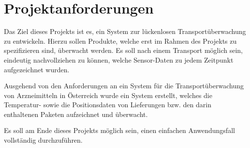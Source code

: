 \section{Projektanforderungen}
\label{sec:requirements}

Das Ziel dieses Projekts ist es, ein System zur lückenlosen Transportüberwachung
	zu entwickeln. Hierzu sollen Produkte, welche erst im Rahmen des Projekts zu
	spezifizieren sind, überwacht werden. Es soll nach einem Transport möglich
	sein, eindeutig nachvollziehen zu können, welche Sensor-Daten zu jedem
	Zeitpunkt aufgezeichnet wurden.

Ausgehend von den Anforderungen an ein System für die Transportüberwachung von
	Arzneimitteln in Österreich \cite{PHARMIG07} wurde ein System erstellt,
	welches die Temperatur- sowie die Positionsdaten von Lieferungen bzw.
	den darin enthaltenen Paketen aufzeichnet und überwacht.
	
Es soll am Ende dieses Projekts möglich sein, einen einfachen Anwendungsfall
	vollständig	durchzuführen.